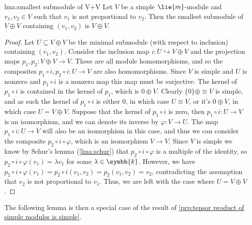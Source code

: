 \documentclass[fleqn]{NotesClass}
\renewcommand{\field}{\symbb{k}}
\newcommand{\isomorphic}{\cong}
\begin{document}
    \begin{lma}{}{lma:smallest submodule of V+V}
        Let \(V\) be a simple \(\lie{m}\)-module and \(v_1, v_2 \in V\) such that \(v_1\) is not proportional to \(v_2\).
        Then the smallest submodule of \(V \oplus V\) containing \((v_1, v_2)\) is \(V \oplus V\).
        \begin{proof}
            Let \(U \subseteq V \oplus V\) be the minimal submodule (with respect to inclusion) containing \((v_1, v_2)\).
            Consider the inclusion map \(i \colon U \hookrightarrow V \oplus V\) and the projection maps \(p_1, p_2 \colon V \oplus V \to V\).
            These are all module homomorphisms, and so the composites \(p_1 \circ i, p_2 \circ i \colon U \to V\) are also homomorphisms.
            Since \(V\) is simple and \(U\) is nonzero and \(p_1 \circ i\) is a nonzero map this map must be surjective.
            The kernel of \(p_1 \circ i\) is contained in the kernel of \(p_1\), which is \(0 \oplus V\).
            Clearly \(\{0\} \oplus \isomorphic V\) is simple, and as such the kernel of \(p_1 \circ i\) is either \(0\), in which case \(U \isomorphic V\), or it's \(0 \oplus V\), in which case \(U = V \oplus V\).
            Suppose that the kernel of \(p_1 \circ i\) is zero, then \(p_1 \circ i \colon U \to V\) is an isomorphism, and we can denote its inverse by \(\varphi \colon V \to U\).
            The map \(p_1 \circ i \colon U \to V\) will also be an isomorphism in this case, and thus we can consider the composite \(p_2 \circ i \circ \varphi\), which is an isomorphism \(V \to V\).
            Since \(V\) is simple we know by Schur's lemma (\cref{lma:schur}) that \(p_2 \circ i \circ \varphi\) is a multiple of the identity, so \(p_2 \circ i \circ \varphi(v_1) = \lambda v_1\) for some \(\lambda \in \field\).
            However, we have \(p_2 \circ i \circ \varphi(v_1) = p_2 \circ i(v_1, v_2) = p_2(v_1, v_2) = v_2\), contradicting the assumption that \(v_2\) is not proportional to \(v_1\).
            Thus, we are left with the case where \(U = V \oplus V\).
        \end{proof}
    \end{lma}
    
    The following lemma is then a special case of the result of \cref{prp:tensor product of simple modules is simple}.
    
\end{document}
